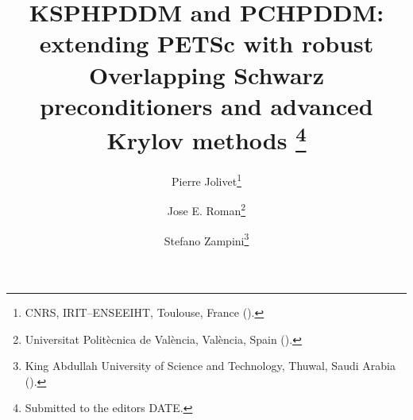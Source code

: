 

\usepackage{lipsum}
\usepackage{amsfonts}
\usepackage{graphicx}
\usepackage{epstopdf}
\usepackage{algorithmic}
\ifpdf
\else
\fi

\newcommand{\creflastconjunction}{, and~}



\title{KSPHPDDM and PCHPDDM: extending PETS\MakeLowercase{c} with robust Overlapping Schwarz preconditioners and advanced Krylov methods
\thanks{Submitted to the editors DATE.
}}

\author{Pierre Jolivet\thanks{CNRS, IRIT--ENSEEIHT, Toulouse, France 
  ().}
\and Jose E. Roman\thanks{Universitat Polit\`ecnica de Val\`encia, Val\`encia, Spain
  ().}
\and Stefano Zampini\thanks{King Abdullah University of Science and Technology, Thuwal, Saudi Arabia 
  ().}}

\usepackage{amsopn}
\DeclareMathOperator{\diag}{diag}


